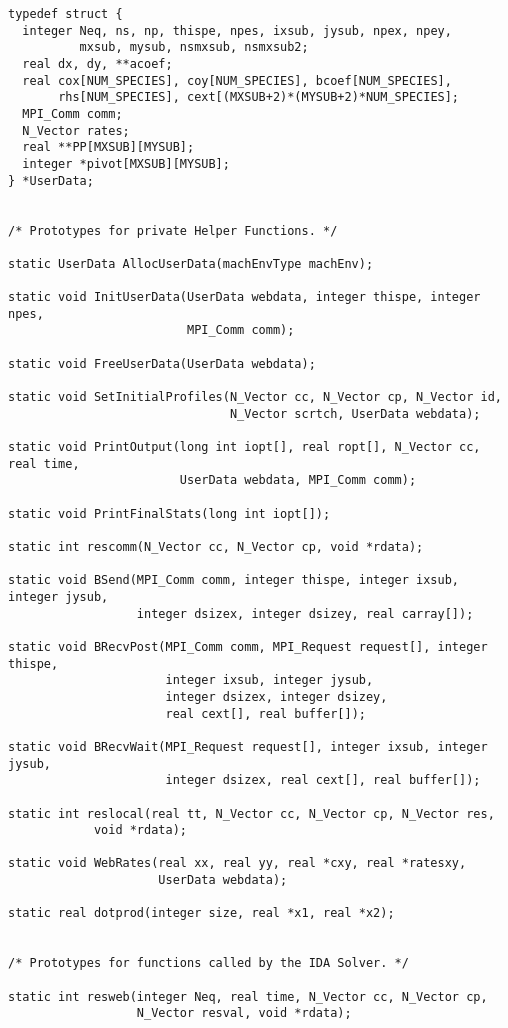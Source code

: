 \documentclass[11pt]{article}
\begin{document}
\begin{verbatim}
typedef struct {
  integer Neq, ns, np, thispe, npes, ixsub, jysub, npex, npey,
          mxsub, mysub, nsmxsub, nsmxsub2;
  real dx, dy, **acoef;
  real cox[NUM_SPECIES], coy[NUM_SPECIES], bcoef[NUM_SPECIES],
       rhs[NUM_SPECIES], cext[(MXSUB+2)*(MYSUB+2)*NUM_SPECIES];
  MPI_Comm comm;
  N_Vector rates;
  real **PP[MXSUB][MYSUB];
  integer *pivot[MXSUB][MYSUB];
} *UserData;


/* Prototypes for private Helper Functions. */

static UserData AllocUserData(machEnvType machEnv);

static void InitUserData(UserData webdata, integer thispe, integer npes, 
                         MPI_Comm comm);

static void FreeUserData(UserData webdata);

static void SetInitialProfiles(N_Vector cc, N_Vector cp, N_Vector id,
                               N_Vector scrtch, UserData webdata);

static void PrintOutput(long int iopt[], real ropt[], N_Vector cc, real time,
                        UserData webdata, MPI_Comm comm);

static void PrintFinalStats(long int iopt[]);

static int rescomm(N_Vector cc, N_Vector cp, void *rdata);

static void BSend(MPI_Comm comm, integer thispe, integer ixsub, integer jysub,
                  integer dsizex, integer dsizey, real carray[]);

static void BRecvPost(MPI_Comm comm, MPI_Request request[], integer thispe,
                      integer ixsub, integer jysub,
                      integer dsizex, integer dsizey,
                      real cext[], real buffer[]);

static void BRecvWait(MPI_Request request[], integer ixsub, integer jysub,
                      integer dsizex, real cext[], real buffer[]);

static int reslocal(real tt, N_Vector cc, N_Vector cp, N_Vector res, 
            void *rdata);

static void WebRates(real xx, real yy, real *cxy, real *ratesxy, 
                     UserData webdata);

static real dotprod(integer size, real *x1, real *x2);


/* Prototypes for functions called by the IDA Solver. */

static int resweb(integer Neq, real time, N_Vector cc, N_Vector cp,
                  N_Vector resval, void *rdata);


\end{verbatim}
\end{document}
